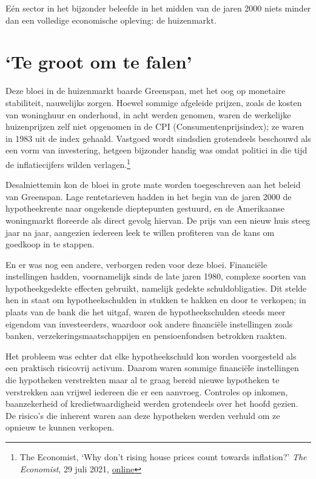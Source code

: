 \documentclass[smalldemyvopaper,11pt,twoside,onecolumn,openright,extrafontsizes,hidelinks]{memoir}
\begin{document}
Eén sector in het bijzonder beleefde in het midden van de jaren 2000
niets minder dan een volledige economische opleving: de huizenmarkt.

\section{`Te groot om te falen'}\label{te-groot-om-te-falen}

Deze bloei in de huizenmarkt baarde Greenspan, met het oog op monetaire
stabiliteit, nauwelijks zorgen. Hoewel sommige afgeleide prijzen, zoals
de kosten van woninghuur en onderhoud, in acht werden genomen, waren de
werkelijke huizenprijzen zelf niet opgenomen in de CPI
(Consumentenprijsindex); ze waren in 1983 uit de index gehaald. Vastgoed
wordt sindsdien grotendeels beschouwd als een vorm van investering,
hetgeen bijzonder handig was omdat politici in die tijd de
inflatiecijfers wilden verlagen.\footnote{The Economist, `Why don't
  rising house prices count towards inflation?' \emph{The Economist}, 29
  juli 2021,
  \href{https://www.economist.com/the-economist-explains/2021/07/29/why-dont-rising-house-prices-count-towards-inflation}{online}}

Desalniettemin kon de bloei in grote mate worden toegeschreven aan het
beleid van Greenspan. Lage rentetarieven hadden in het begin van de
jaren 2000 de hypotheekrente naar ongekende dieptepunten gestuurd, en de
Amerikaanse woningmarkt floreerde als direct gevolg hiervan. De prijs
van een nieuw huis steeg jaar na jaar, aangezien iedereen leek te willen
profiteren van de kans om goedkoop in te stappen.

En er was nog een andere, verborgen reden voor deze bloei. Financiële
instellingen hadden, voornamelijk sinds de late jaren 1980, complexe
soorten van hypotheekgedekte effecten gebruikt, namelijk gedekte
schuldobligaties. Dit stelde hen in staat om hypotheekschulden in
stukken te hakken en door te verkopen; in plaats van de bank die het
uitgaf, waren de hypotheekschulden steeds meer eigendom van
investeerders, waardoor ook andere financiële instellingen zoals banken,
verzekeringsmaatschappijen en pensioenfondsen betrokken raakten.

Het probleem was echter dat elke hypotheekschuld kon worden voorgesteld
als een praktisch risicovrij activum. Daarom waren sommige financiële
instellingen die hypotheken verstrekten maar al te graag bereid nieuwe
hypotheken te verstrekken aan vrijwel iedereen die er een aanvroeg.
Controles op inkomen, baanzekerheid of kredietwaardigheid werden
grotendeels over het hoofd gezien. De risico's die inherent waren aan
deze hypotheken werden verhuld om ze opnieuw te kunnen verkopen.
\end{document}
